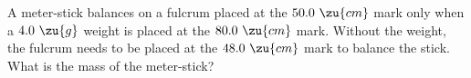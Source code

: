 A meter-stick balances on a fulcrum placed at the $50.0\ \zu{cm}$ mark only when a $4.0\ \zu{g}$ weight is placed at
the $80.0\ \zu{cm}$ mark. Without the weight, the fulcrum
needs to be placed at the $48.0\ \zu{cm}$ mark to balance the
stick. What is the mass of the meter-stick?
